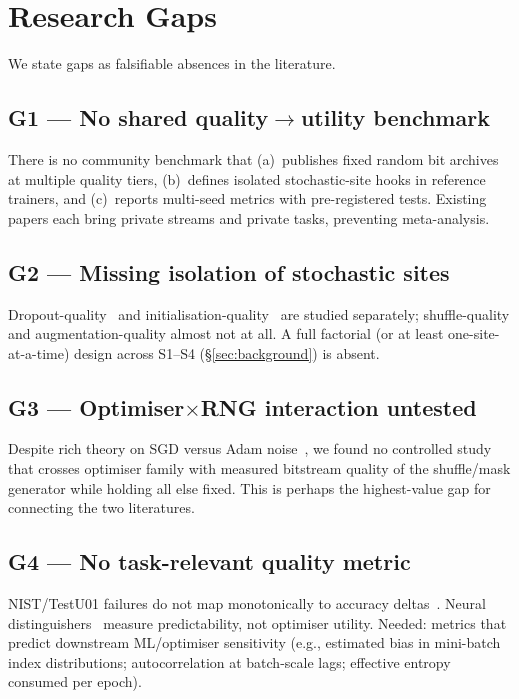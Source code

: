 \section{Research Gaps}
\label{sec:gaps}

We state gaps as falsifiable absences in the literature.

\subsection{G1 --- No shared quality$\to$utility benchmark}

There is no community benchmark that (a)~publishes fixed random bit archives at multiple quality tiers, (b)~defines isolated stochastic-site hooks in reference trainers, and (c)~reports multi-seed metrics with pre-registered tests.
Existing papers each bring private streams and private tasks, preventing meta-analysis.

\subsection{G2 --- Missing isolation of stochastic sites}

Dropout-quality~\cite{koivu2022dropout} and initialisation-quality~\cite{bird2019softcomputing,heese2024biased} are studied separately; shuffle-quality and augmentation-quality almost not at all.
A full factorial (or at least one-site-at-a-time) design across S1--S4 (\S\ref{sec:background}) is absent.

\subsection{G3 --- Optimiser$\times$RNG interaction untested}

Despite rich theory on SGD versus Adam noise~\cite{zhou2020adamsgd,liu2020radam,wu2022alignment}, we found no controlled study that crosses optimiser family with measured bitstream quality of the shuffle/mask generator while holding all else fixed.
This is perhaps the highest-value gap for connecting the two literatures.

\subsection{G4 --- No task-relevant quality metric}

NIST/TestU01 failures do not map monotonically to accuracy deltas~\cite{antunes2025influence}.
Neural distinguishers~\cite{valle2024assessing} measure predictability, not optimiser utility.
Needed: metrics that predict downstream ML/optimiser sensitivity (e.g., estimated bias in mini-batch index distributions; autocorrelation at batch-scale lags; effective entropy consumed per epoch).

